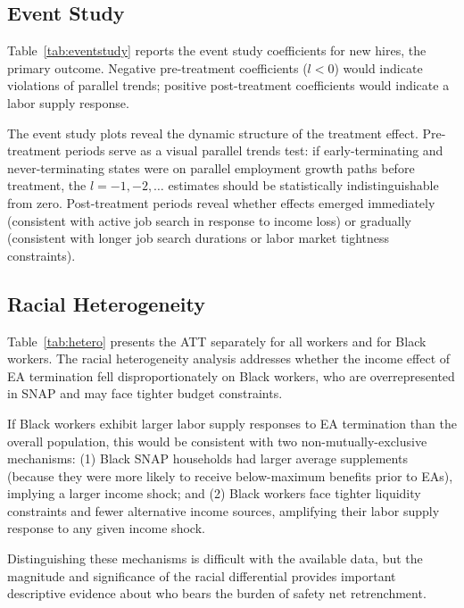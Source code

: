 \documentclass[12pt]{article}
\begin{document}
\subsection{Event Study}



Table~\ref{tab:eventstudy} reports the event study coefficients for new hires, the primary outcome. Negative pre-treatment coefficients ($l < 0$) would indicate violations of parallel trends; positive post-treatment coefficients would indicate a labor supply response.

The event study plots reveal the dynamic structure of the treatment effect. Pre-treatment periods serve as a visual parallel trends test: if early-terminating and never-terminating states were on parallel employment growth paths before treatment, the $l = -1, -2, \ldots$ estimates should be statistically indistinguishable from zero. Post-treatment periods reveal whether effects emerged immediately (consistent with active job search in response to income loss) or gradually (consistent with longer job search durations or labor market tightness constraints).

\subsection{Racial Heterogeneity}



Table~\ref{tab:hetero} presents the ATT separately for all workers and for Black workers. The racial heterogeneity analysis addresses whether the income effect of EA termination fell disproportionately on Black workers, who are overrepresented in SNAP and may face tighter budget constraints.

If Black workers exhibit larger labor supply responses to EA termination than the overall population, this would be consistent with two non-mutually-exclusive mechanisms: (1) Black SNAP households had larger average supplements (because they were more likely to receive below-maximum benefits prior to EAs), implying a larger income shock; and (2) Black workers face tighter liquidity constraints and fewer alternative income sources, amplifying their labor supply response to any given income shock.

Distinguishing these mechanisms is difficult with the available data, but the magnitude and significance of the racial differential provides important descriptive evidence about who bears the burden of safety net retrenchment.
\end{document}
